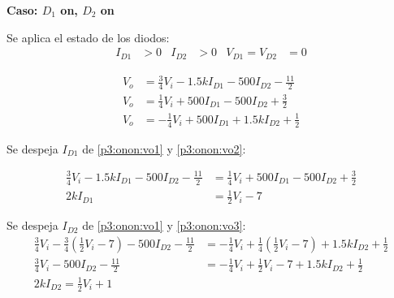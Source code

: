 %
%
%

\textbf{Caso: $D_1$ on, $D_2$ on}

Se aplica el estado de los diodos:
\begin{align*}
  I_{D1} &> 0
  &
  I_{D2} &> 0
  &
  V_{D1} = V_{D2} &= 0
\end{align*}

\begin{align}
  V_o &=
    \frac{3}{4} V_i
    - 1.5k I_{D1}
    - 500 I_{D2}
    - \frac{11}{2} \label{p3:onon:vo1}
  \\
  V_o &=
    \frac{1}{4} V_i
    + 500 I_{D1}
    - 500 I_{D2}
    + \frac{3}{2} \label{p3:onon:vo2}
  \\
  V_o &=
    - \frac{1}{4} V_i
    + 500 I_{D1}
    + 1.5k I_{D2}
    + \frac{1}{2} \label{p3:onon:vo3}
\end{align}

Se despeja $I_{D1}$ de \ref{p3:onon:vo1} y \ref{p3:onon:vo2}:

\begin{align*}
  \frac{3}{4} V_i - 1.5k I_{D1} - 500 I_{D2} - \frac{11}{2} &=
  \frac{1}{4} V_i + 500 I_{D1}  - 500 I_{D2} + \frac{3}{2}
  \\
  2k I_{D1} &= \frac{1}{2} V_i - 7
\end{align*}

Se despeja $I_{D2}$ de \ref{p3:onon:vo1} y \ref{p3:onon:vo3}:
\begin{align*}
  \frac{3}{4} V_i   - \frac{3}{4} \left( \frac{1}{2} V_i - 7 \right) - 500 I_{D2}  - \frac{11}{2} &=
  - \frac{1}{4} V_i + \frac{1}{4} \left( \frac{1}{2} V_i - 7 \right) + 1.5k I_{D2} + \frac{1}{2}
  \\
  \frac{3}{4} V_i                         - 500 I_{D2}  - \frac{11}{2} &=
  - \frac{1}{4} V_i + \frac{1}{2} V_i - 7 + 1.5k I_{D2} + \frac{1}{2}
  \\
  2k I_{D2} = \frac{1}{2} V_i + 1
\end{align*}

